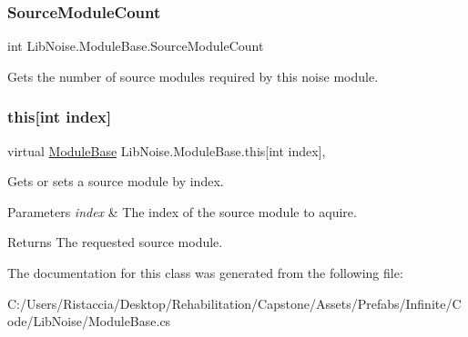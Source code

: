 \subsubsection{\texorpdfstring{Source\+Module\+Count}{SourceModuleCount}}
{\footnotesize\ttfamily int Lib\+Noise.\+Module\+Base.\+Source\+Module\+Count\hspace{0.3cm}{\ttfamily [get]}}



Gets the number of source modules required by this noise module. 

\mbox{\label{class_lib_noise_1_1_module_base_a82ba7cc8a454de882e305ebb0e9e2e1c}} 
\subsubsection{\texorpdfstring{this[int index]}{this[int index]}}
{\footnotesize\ttfamily virtual \hyperlink{class_lib_noise_1_1_module_base}{Module\+Base} Lib\+Noise.\+Module\+Base.\+this\mbox{[}int index\mbox{]}\hspace{0.3cm}{\ttfamily [get]}, {\ttfamily [set]}}



Gets or sets a source module by index. 


\begin{DoxyParams}{Parameters}
{\em index} & The index of the source module to aquire.\\
\hline
\end{DoxyParams}
\begin{DoxyReturn}{Returns}
The requested source module.
\end{DoxyReturn}


The documentation for this class was generated from the following file\+:\begin{DoxyCompactItemize}
\item 
C\+:/\+Users/\+Ristaccia/\+Desktop/\+Rehabilitation/\+Capstone/\+Assets/\+Prefabs/\+Infinite/\+Code/\+Lib\+Noise/Module\+Base.\+cs\end{DoxyCompactItemize}
